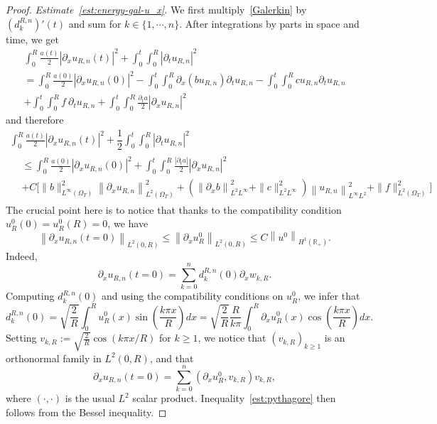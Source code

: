 \documentclass[10pt]{amsart}
\theoremstyle{definition}\newtheorem{defi}[theo]{Definition}\newtheorem{rema}[theo]{Remark}\newtheorem{exam}[theo]{Example}\newtheorem{exem}[theo]{Example}\newtheorem{nota}[theo]{Notation}
\newcommand{\R}{\mathbb{R}}
\newcommand{\p}{\partial}
\begin{document}
\begin{proof}

\emph{Estimate~\eqref{est:energy-gal-u_x}.}
We first multiply~\eqref{Galerkin} by $(d^{R,n}_k)'(t)$ and sum for $k\in \{1,\cdots, n\}$. After integrations by parts in space and time, we get
\begin{multline*}
\int_0^R \frac{a(t)}{2} \left|\partial_x u_{R,n}(t)\right|^2 + \int_0^t \int_0^R \left|\partial_t u_{R,n}\right|^2 \\
 = \int_0^R \frac{a(0)}{2}\left|\partial_x u_{R,n}(0)\right|^2 - \int_0^t \int_0^R \partial_x(b u_{R,n}) \partial_t u_{R,n} - \int_0^t \int_0^R c u_{R,n} \partial_t u_{R,n} \\
+ \int_0^t \int_0^R f \ \partial_t u_{R,n} + \int_0^t \int_0^R \frac{\partial_t a}{2}\left|\partial_x u_{R,n}\right|^2
\end{multline*}
and therefore
\begin{multline}\label{eq:du1}
\int_0^R \frac{a(t)}{2} \left|\partial_x u_{R,n}(t)\right|^2 + \dfrac{1}{2} \int_0^t \int_0^R \left|\partial_t u_{R,n}\right|^2 
\\
\begin{aligned}
 &\leq \int_0^R \frac{a(0)}{2} \left|\partial_x u_{R,n}(0)\right|^2 + \int_0^t \int_0^R \frac{|\partial_t a|}{2} \left|\partial_x u_{R,n}\right|^2 \\
&+ C \Big[
\|b\|_{L^\infty(\Omega_T)}^2 \left\|\partial_x u_{R,n}\right\|_{L^2(\Omega_T)}^2 +\left(\left\|\partial_x b\right\|_{L^2 L^\infty}^2 + \|c\|_{L^2 L^\infty}^2\right) \left\|u_{R,n}\right\|_{L^\infty L^2}^2 + \|f\|_{L^2(\Omega_T)}^2 \Big]
\end{aligned}
\end{multline}
The crucial point here is to notice that thanks to the compatibility condition $u_R^0(0)=u_R^0(R)=0$, we have
\begin{equation}\label{est:pythagore}
\left\| \p_x u_{R,n}(t=0)\right\|_{L^2(0,R)}\leq \left\| \p_x u_R^0\right\|_{L^2(0,R)}\leq C \left\| u^0\right\|_{H^1(\R_+)}.
\end{equation}
Indeed,
\[
\p_x u_{R,n}(t=0)=\sum_{k=0}^n d^{R,n}_k(0) \p_x w_{k,R}.
\]
Computing $d^{R,n}_k(0)$ and using the compatibility conditions on $u_R^0$, we infer that
\[
d^{R,n}_k(0)= \sqrt{\frac{2}{R}}\int_0^R u_R^0(x)\sin \left(\frac{k\pi x}{R}\right)dx=\sqrt{\frac{2}{R}}\frac{R}{k\pi}\int_0^R\p_x u_R^0(x)\cos \left(\frac{k\pi x}{R}\right)dx.
\]
Setting $v_{k,R}:=\sqrt{\frac{2}{R}}\cos(k\pi x/R)$ for $k\geq 1$, we notice that $(v_{k,R})_{k\geq 1}$ is an orthonormal family in $L^2(0,R)$, and that
\[
\p_x u_{R,n}(t=0)=\sum_{k=0}^n \left(\p_x u_R^0, v_{k,R}\right) v_{k,R},
\]
where $(\cdot,\cdot)$ is the usual $L^2$ scalar product. Inequality~\eqref{est:pythagore} then follows from the Bessel inequality.



\end{proof}
\end{document}
